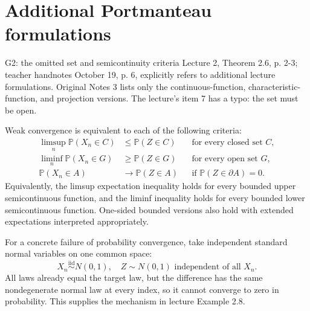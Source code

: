 \documentclass[12pt]{article}
\newcommand{\Prob}{\mathbb P}
\begin{document}
\section{Additional Portmanteau formulations}
\begin{gapbox}{G2: the omitted set and semicontinuity criteria}
Lecture 2, Theorem 2.6, p. 2-3; teacher handnotes October 19, p. 6,
explicitly refers to additional lecture formulations. Original Notes 3
lists only the continuous-function, characteristic-function, and projection
versions. The lecture's item 7 has a typo: the set must be open.
\end{gapbox}
Weak convergence is equivalent to each of the following criteria:
\begin{align}
 \limsup_n\Prob(X_n\in C)&\le\Prob(Z\in C)
 &&\text{for every closed set }C,\\
 \liminf_n\Prob(X_n\in G)&\ge\Prob(Z\in G)
 &&\text{for every open set }G,\\
 \Prob(X_n\in A)&\to\Prob(Z\in A)
 &&\text{if }\Prob(Z\in\partial A)=0.
\end{align}
Equivalently, the limsup expectation inequality holds for every bounded
upper semicontinuous function, and the liminf inequality holds for every
bounded lower semicontinuous function. One-sided bounded versions also hold
with extended expectations interpreted appropriately.

For a concrete failure of probability convergence, take independent
standard normal variables on one common space:
\begin{equation}
 X_n\overset{\mathrm{iid}}\sim N(0,1),\quad Z\sim N(0,1)
 \text{ independent of all }X_n.
\end{equation}
All laws already equal the target law, but the difference has the same
nondegenerate normal law at every index, so it cannot converge to zero
in probability. This supplies the mechanism in lecture Example 2.8.
\end{document}
